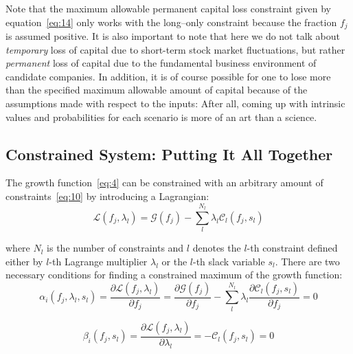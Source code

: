 \documentclass{article}
\begin{document}
\begin{enumerate}
\indent Note that the maximum allowable permanent capital loss constraint
given by equation~\eqref{eq:14} only works with the long--only constraint
because the fraction $f_j$ is assumed positive. It is also important to note
that here we do not talk about {\it temporary} loss of capital due to short-term
stock market fluctuations, but rather {\it permanent} loss of capital due to the
fundamental business environment of candidate companies. In addition, it is of
course possible for one to lose more than the specified maximum allowable amount
of capital because of the assumptions made with respect to the inputs: After
all, coming up with intrinsic values and probabilities for each scenario is more
of an art than a science.

\end{enumerate}

\subsection{Constrained System: Putting It All Together}
\label{sec:constrainedSystem}

\noindent The growth function~\eqref{eq:4} can be constrained with an arbitrary
amount of constraints~\eqref{eq:10} by introducing a Lagrangian:
\begin{equation}
\label{eq:15}
    \mathcal{L}(f_j, \lambda_l)
  =
    \mathcal{G}(f_j) - \sum_l^{N_l} \lambda_l \mathcal{C}_l(f_j, s_l)
\end{equation}

\noindent where $N_l$ is the number of constraints and $l$ denotes the $l$-th
constraint defined either by $l$-th Lagrange multiplier $\lambda_l$ or the
$l$-th slack variable $s_l$. There are two necessary conditions for finding a
constrained maximum of the growth function:
\begin{equation}
\label{eq:16}
    \alpha_i(f_j, \lambda_l, s_l)
  =
    \frac{\partial \mathcal{L}(f_j, \lambda_l)}{\partial f_j}
  =
    \frac{\partial \mathcal{G}(f_j)}{\partial f_j}
  - \sum_l^{N_l} \lambda_l \frac{\partial{\mathcal{C}_l(f_j, s_l)}}{\partial f_j}
  =
    0
\end{equation}

\begin{equation}
\label{eq:17}
    \beta_i(f_j, s_l)
  =
    \frac{\partial \mathcal{L}(f_j, \lambda_l)}{\partial \lambda_l}
  =
    - \mathcal{C}_l(f_j, s_l)
  =
    0
\end{equation}
\end{document}
